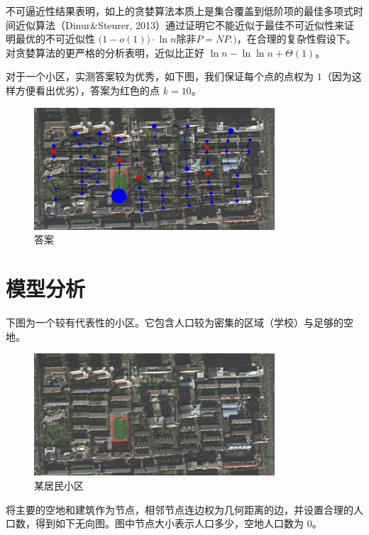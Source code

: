 \documentclass{cumcmthesis}
\begin{document}
不可逼近性结果表明，如上的贪婪算法本质上是集合覆盖到低阶项的最佳多项式时间近似算法（Dinur\&Steurer, 2013）通过证明它不能近似于最佳不可近似性来证明最优的不可近似性 ${\displaystyle {\bigl (}1-o(1){\bigr )}\cdot \ln {n}}\text{除非} P{\displaystyle =}NP.)$，在合理的复杂性假设下。对贪婪算法的更严格的分析表明，近似比正好 ${\displaystyle \ln {n}-\ln {\ln {n}}+\Theta(1)}$。

对于一个小区，实测答案较为优秀，如下图，我们保证每个点的点权为 $1$（因为这样方便看出优劣），答案为红色的点 $k=10$。

\begin{figure}[H]
	\centering
	\includegraphics[width=0.80\textwidth]{images/Problem3Subtask2.png}
	\caption{答案}
	\label{fig:mdst-graph}
\end{figure}

\section{模型分析}

下图为一个较有代表性的小区。它包含人口较为密集的区域（学校）与足够的空地。

\begin{figure}[H]
    \centering
    \includegraphics[width=0.8\textwidth]{images/scaled.png}
    \caption{某居民小区}
    \label{fig:scaled}
\end{figure}

将主要的空地和建筑作为节点，相邻节点连边权为几何距离的边，并设置合理的人口数，得到如下无向图。图中节点大小表示人口多少，空地人口数为 $0$。
\end{document}
